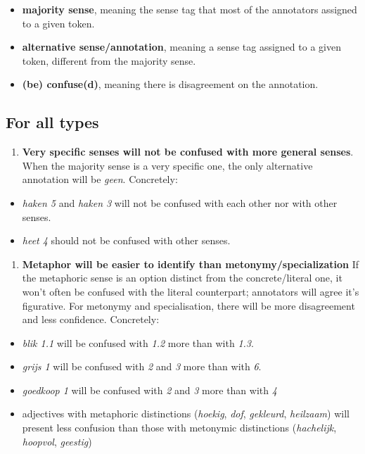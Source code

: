 \documentclass[
]{book}
\providecommand{\tightlist}{%
  \setlength{\itemsep}{0pt}\setlength{\parskip}{0pt}}
\begin{document}
\begin{itemize}
\tightlist
\item
  \textbf{majority sense}, meaning the sense tag that most of the annotators assigned to a given token.
\item
  \textbf{alternative sense/annotation}, meaning a sense tag assigned to a given token, different from the majority sense.
\item
  \textbf{(be) confuse(d)}, meaning there is disagreement on the annotation.
\end{itemize}

\hypertarget{for-all-types}{%
\subsection{For all types}\label{for-all-types}}

\begin{enumerate}
\def\labelenumi{\arabic{enumi}.}
\tightlist
\item
  \textbf{Very specific senses will not be confused with more general senses}.
  When the majority sense is a very specific one, the only alternative annotation will be \emph{geen}.
  Concretely:
\end{enumerate}

\begin{itemize}
\tightlist
\item
  \emph{haken 5} and \emph{haken 3} will not be confused with each other nor with other senses.
\item
  \emph{heet 4} should not be confused with other senses.
\end{itemize}

\begin{enumerate}
\def\labelenumi{\arabic{enumi}.}
\setcounter{enumi}{1}
\tightlist
\item
  \textbf{Metaphor will be easier to identify than metonymy/specialization}
  If the metaphoric sense is an option distinct from the concrete/literal one, it won't often be confused with the literal counterpart; annotators will agree it's figurative. For metonymy and specialisation, there will be more disagreement and less confidence.
  Concretely:
\end{enumerate}

\begin{itemize}
\tightlist
\item
  \emph{blik 1.1} will be confused with \emph{1.2} more than with \emph{1.3}.
\item
  \emph{grijs 1} will be confused with \emph{2} and \emph{3} more than with \emph{6}.
\item
  \emph{goedkoop 1} will be confused with \emph{2} and \emph{3} more than with \emph{4}
\item
  adjectives with metaphoric distinctions (\emph{hoekig}, \emph{dof}, \emph{gekleurd}, \emph{heilzaam}) will present less confusion than those with metonymic distinctions (\emph{hachelijk}, \emph{hoopvol}, \emph{geestig})
\end{itemize}
\end{document}
